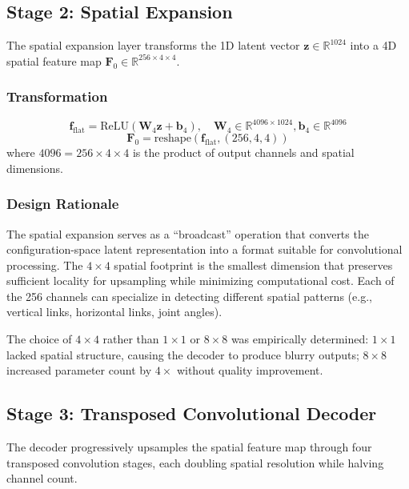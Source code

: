 \documentclass[12pt,a4paper,oneside]{report}
\begin{document}
\subsection{Stage 2: Spatial Expansion}

The spatial expansion layer transforms the 1D latent vector $\mathbf{z} \in \mathbb{R}^{1024}$ into a 4D spatial feature map $\mathbf{F}_0 \in \mathbb{R}^{256 \times 4 \times 4}$.

\subsubsection{Transformation}

\begin{equation}
\mathbf{f}_{\text{flat}} = \text{ReLU}(\mathbf{W}_4 \mathbf{z} + \mathbf{b}_4), \quad \mathbf{W}_4 \in \mathbb{R}^{4096 \times 1024}, \mathbf{b}_4 \in \mathbb{R}^{4096}
\end{equation}
\begin{equation}
\mathbf{F}_0 = \text{reshape}(\mathbf{f}_{\text{flat}}, (256, 4, 4))
\end{equation}
where $4096 = 256 \times 4 \times 4$ is the product of output channels and spatial dimensions.

\subsubsection{Design Rationale}

The spatial expansion serves as a ``broadcast'' operation that converts the configuration-space latent representation into a format suitable for convolutional processing. The $4 \times 4$ spatial footprint is the smallest dimension that preserves sufficient locality for upsampling while minimizing computational cost. Each of the 256 channels can specialize in detecting different spatial patterns (e.g., vertical links, horizontal links, joint angles).

The choice of $4 \times 4$ rather than $1 \times 1$ or $8 \times 8$ was empirically determined: $1 \times 1$ lacked spatial structure, causing the decoder to produce blurry outputs; $8 \times 8$ increased parameter count by $4\times$ without quality improvement.

\subsection{Stage 3: Transposed Convolutional Decoder}

The decoder progressively upsamples the spatial feature map through four transposed convolution stages, each doubling spatial resolution while halving channel count.
\end{document}
